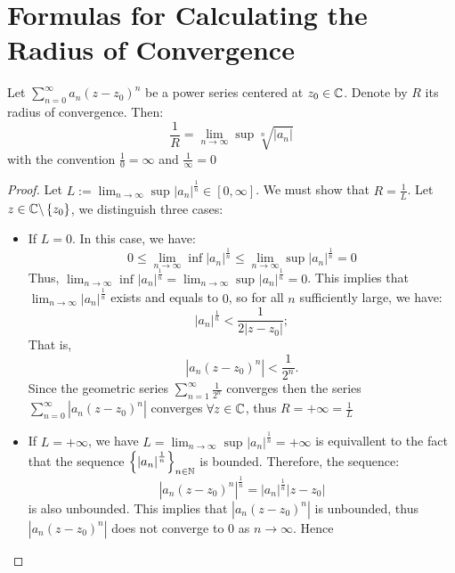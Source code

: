 \section{Formulas for Calculating the Radius of Convergence}
\begin{proposition}
  Let $\sum_{n=0}^{\infty} a_n (z-z_0) ^n  $ be a power series centered at 
  $z_0 \in \mathbb{C}$. Denote by $R $ its radius of convergence. Then: 
  \[
  \frac{1}{R} = 
  \lim_{n \to \infty} \sup_{} 
  \sqrt[n]{\left| a_n  \right|}
  \]
  with the convention $\frac{1}{0} = \infty  $  and $\frac{1}{\infty }= 0 $ 
\end{proposition}
\begin{proof}
  Let $L := \lim_{n \to \infty} \sup_{} \left| a_n  \right|^{\frac{1}{n}} \in \left[ 0, \infty  \right]$. 
  We must show that $R = \frac{1}{L} $. Let $z \in  \mathbb{C} \backslash \left\{ z_0 \right\} $, we distinguish 
  three cases:
  \begin{itemize}
    \item[\ding{50}\ding{172}] If $L = 0 $. In this case, we have:
      \[
        0 \leq  \lim_{n \to \infty} \inf_{} \left| a_n  \right|^{\frac{1}{n}} \leq 
        \lim_{n \to \infty} \sup_{} 
        \left| a_n  \right|^{\frac{1}{n}} = 0
      \]
      Thus, $\lim_{n \to \infty} \inf_{} \left| a_n  \right|^{\frac{1}{n}} = \lim_{n \to \infty} \sup_{} 
      \left| a_n  \right|^{\frac{1}{n}} = 0$.
  This implies that $\lim_{n \to \infty} \left| a_n  \right|^{\frac{1}{n}} $ exists and equals to $0$, so for all
  $n $ sufficiently large, we have: 
  \[
    \left| a_n  \right|^{\frac{1}{n}} <  
    \frac{1}{2 \left| z-z_0 \right|} ;
  \]
  That is,
  \[
  \left| a_n (z-z_0) ^n  \right| <  
  \frac{1}{2^n }.
  \]
  Since the geometric series $\sum_{n=1}^{\infty} \frac{1}{2^{n}} $ converges
  then the series $\sum_{n=0}^{\infty} \left| a_n (z-z_0) ^n  \right| $ converges 
  $\forall z \in  \mathbb{C}  $, thus $R = +\infty = \frac{1}{L}$ 
\item[\ding{50} \ding{173}] If $L = +\infty $, we have $L = \lim_{n \to \infty} \sup_{} \left| a_n  \right|^{\frac{1}{n}} = +\infty $ is 
   equivallent to the fact that the sequence $\left\{ \left| a_n  \right|^{\frac{1}{n}} \right\}_{n \in \mathbb{N}} $ is bounded.
   Therefore, the sequence: 
   \[
   \left| a_n (z-z_0) ^n \right|^{\frac{1}{n}} = 
   \left| a_n  \right|^{\frac{1}{n}} \left| 
   z-z_0\right| 
   \]
   is also unbounded. This implies that $\left| a_n (z-z_0) ^n  \right| $ is unbounded, thus 
   $\left| a_n (z-z_0) ^n  \right|$ does not converge to $0 $ as $n \rightarrow \infty  $. Hence 

\end{itemize}
\end{proof}
